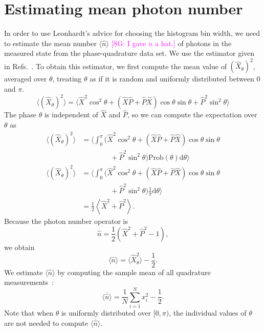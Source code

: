 \documentclass[
reprint,
superscriptaddress,
showpacs,
amsmath,
amssymb,
aps,
pra,
longbibliography
]{revtex4-1}
\providecommand{\aucmnt}[1]{#1}
\providecommand{\editcolor}[2]{\textcolor{#1}{#2}}
\providecommand{\aucmnt}[1]{}
\providecommand{\editcolor}[2]{#2}
\newcommand{\SGc}[1]{\aucmnt{\editcolor{magenta}{[SG: #1]}}}
\begin{document}
\section{Estimating mean photon number}
\label{sec-photon-estimation}
In order to use Leonhardt's advice for choosing the histogram bin
width, we need to estimate the mean number $\langle \hat{n} \rangle$
\SGc{I gave $n$ a hat.} of photons in the measured state from the
phase-quadrature data set. We use the estimator given in
Refs.~\cite{Hradil2,Munroe1996}.  To obtain this estimator, we first
compute the mean value of $(\hat{X}_{\theta})^{2}$, averaged over
$\theta$, treating $\theta$ as if it is random and uniformly
distributed between $0$ and $\pi$.
\begin{equation}
  \langle (\hat{X}_{\theta})^{2} \rangle = \langle \hat{X}^{2}\cos^{2}\theta + (\hat{X}\hat{P}+\hat{P}\hat{X})\cos\theta\sin\theta + \hat{P}^{2}\sin^{2}\theta \rangle
\end{equation}
The phase $\theta$ is independent of $\hat{X}$ and $\hat{P}$, so we
can compute the expectation over $\theta$ as
\begin{align}
  \langle (\hat{X}_{\theta})^{2} \rangle &= \Big\langle \int_{0}^{\pi} (\hat{X}^{2}\cos^{2}\theta + (\hat{X}\hat{P}+\hat{P}\hat{X})\cos\theta\sin\theta \nonumber \\
                                         & \qquad \qquad + \hat{P}^{2}\sin^{2}\theta) \mathrm{Prob}(\theta) \mathrm{d}\theta \Big\rangle \\
  \langle (\hat{X}_{\theta})^{2} \rangle &= \Big\langle \int_{0}^{\pi} (\hat{X}^{2}\cos^{2}\theta + (\hat{X}\hat{P}+\hat{P}\hat{X})\cos\theta\sin\theta \nonumber \\
                                         & \qquad \qquad + \hat{P}^{2}\sin^{2}\theta) \frac{1}{\pi} \mathrm{d}\theta \Big\rangle \\
                                         &= \frac{1}{2}\left\langle \hat{X}^{2} + \hat{P}^{2} \right\rangle.
\end{align}
Because the photon number operator is
\begin{equation}
  \hat{n} = \frac{1}{2}\left(\hat{X}^{2}+\hat{P}^{2}-1\right),
\end{equation}
we obtain
\begin{equation}
  \langle\hat{n}\rangle = \langle \hat{X}_{\theta}^{2}\rangle-\frac{1}{2}. 
\end{equation}
We estimate $\langle \hat{n} \rangle$ by computing the sample
mean of all quadrature measurements~\cite{Hradil2,Munroe1996}:
\begin{equation}
  \overline{\langle \hat{n} \rangle} = \frac{1}{N} \sum_{i=1}^{N}x_{i}^{2} - \frac{1}{2}.
  \label{eq-photon-estimation}
\end{equation}
Note that when $\theta$ is uniformly distributed over $[0,\pi)$, the
individual values of $\theta$ are not needed to compute
$\overline{\langle \hat{n} \rangle}$.
\end{document}
